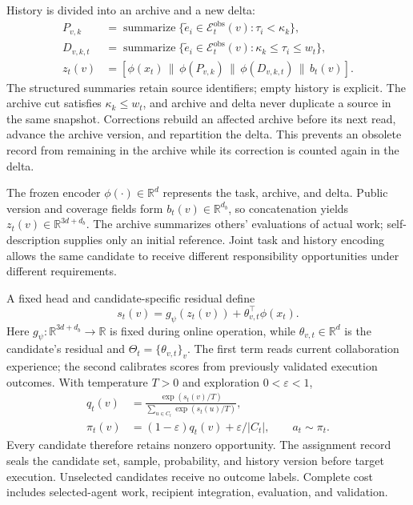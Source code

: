 \documentclass[sigconf,anonymous]{aamas}
\begin{document}
History is divided into an archive and a new delta:
\begin{align}
 P_{v,k}&=\operatorname{summarize}\{\tilde e_i\in\mathcal E_t^{\mathrm{obs}}(v):\tau_i<\kappa_k\},\\
 D_{v,k,t}&=\operatorname{summarize}\{\tilde e_i\in\mathcal E_t^{\mathrm{obs}}(v):\kappa_k\leq\tau_i\leq w_t\},\\
 z_t(v)&=[\phi(x_t)\,\|\,\phi(P_{v,k})\,\|\,\phi(D_{v,k,t})\,\|\,b_t(v)].
\label{eq:representation}
\end{align}
The structured summaries retain source identifiers; empty history is explicit. The archive cut satisfies $\kappa_k\leq w_t$, and archive and delta never duplicate a source in the same snapshot. Corrections rebuild an affected archive before its next read, advance the archive version, and repartition the delta. This prevents an obsolete record from remaining in the archive while its correction is counted again in the delta.

The frozen encoder $\phi(\cdot)\in\mathbb R^d$ represents the task, archive, and delta. Public version and coverage fields form $b_t(v)\in\mathbb R^{d_b}$, so concatenation yields $z_t(v)\in\mathbb R^{3d+d_b}$. The archive summarizes others' evaluations of actual work; self-description supplies only an initial reference. Joint task and history encoding allows the same candidate to receive different responsibility opportunities under different requirements.

A fixed head and candidate-specific residual define
\begin{equation}
 s_t(v)=g_\psi(z_t(v))+\theta_{v,t}^{\top}\phi(x_t).
\end{equation}
Here $g_\psi:\mathbb R^{3d+d_b}\rightarrow\mathbb R$ is fixed during online operation, while $\theta_{v,t}\in\mathbb R^d$ is the candidate's residual and $\Theta_t=\{\theta_{v,t}\}_v$. The first term reads current collaboration experience; the second calibrates scores from previously validated execution outcomes. With temperature $T>0$ and exploration $0<\varepsilon<1$,
\begin{align}
 q_t(v)&=\frac{\exp(s_t(v)/T)}{\sum_{u\in C_t}\exp(s_t(u)/T)},\\
 \pi_t(v)&=(1-\varepsilon)q_t(v)+\varepsilon/|C_t|,\qquad a_t\sim\pi_t.
\label{eq:policy}
\end{align}
Every candidate therefore retains nonzero opportunity. The assignment record seals the candidate set, sample, probability, and history version before target execution. Unselected candidates receive no outcome labels. Complete cost includes selected-agent work, recipient integration, evaluation, and validation.
\end{document}
